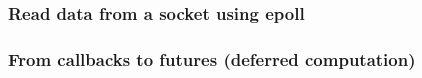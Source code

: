\begin{frame}[fragile]
    \frametitle{Read data from a socket using epoll}
% 
% 
% 
% 
% 
% 
\end{frame}
\begin{frame}[fragile]
    \frametitle{From callbacks to futures (deferred computation)}
% 
% 
% 
% 
% 
\end{frame}

